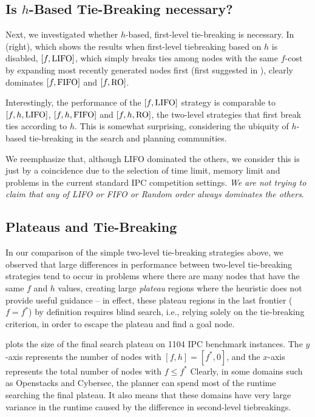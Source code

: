 \subsection{Is $h$-Based Tie-Breaking necessary?}

Next, we investigated whether $h$-based, first-level tie-breaking is necessary.
In  (right), which shows the results when  first-level
tiebreaking based on $h$ is disabled, $[f, \mbox{LIFO}]$, which simply breaks ties among nodes with the same $f$-cost by expanding most recently generated nodes first (first suggested in \cite{korf1985depth}),
clearly dominates $[f, \mbox{FIFO}]$ and $[f, \mbox{RO}]$.

Interestingly, the performance of the $[f, \mbox{LIFO}]$ strategy
is comparable to $[f,h,\mbox{LIFO}]$, $[f,h,\mbox{FIFO}]$ and $[f,h,\mbox{RO}]$, the two-level strategies that first break ties according to $h$.
This is somewhat surprising, considering the ubiquity of $h$-based tie-breaking in the search and planning communities.

We reemphasize that, although LIFO dominated the others, we consider
this is just by a coincidence due to the selection of time limit, memory
limit and problems in the current standard IPC competition
settings. \emph{We are not trying to claim that any of LIFO or FIFO or
Random order always dominates the others}.


\subsection{Plateaus and Tie-Breaking}

In our comparison of the simple two-level tie-breaking strategies
above, we observed that large differences in performance between
two-level tie-breaking strategies tend to occur in problems where
there are many nodes that have the same $f$ and $h$ values, creating
large \emph{plateau} regions where the heuristic does not provide
useful guidance -- in effect, these plateau regions in the last
frontier ($f=f^*$) by definition requires blind search, i.e., 
relying solely on the tie-breaking criterion, in order to escape the
plateau and find a goal node.

 plots the size of the final search plateau on 1104 IPC benchmark instances.
The $y$-axis
represents the number of nodes with $[f,h]=[f^*,0]$, and the $x$-axis represents the total
number of nodes with $f\leq f^*$ 
Clearly, in some domains such as Openstacks and Cybersec, the planner can spend most of the runtime
searching the final plateau.
It also
means that these domains have very large variance in the runtime caused
by the difference in second-level tiebreakings. 

